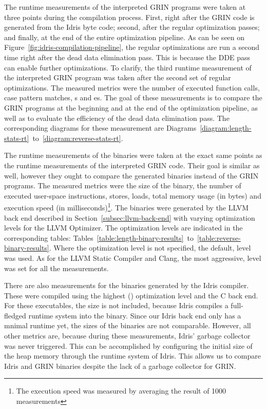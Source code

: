 \documentclass[main.tex]{subfiles}
\begin{document}
	The runtime measurements of the interpreted GRIN programs were taken at three points during the compilation process. First, right after the GRIN code is generated from the Idris byte code; second, after the regular optimization passes; and finally, at the end of the entire optimization pipeline. As can be seen on Figure~\ref{fig:idris-compilation-pipeline}, the regular optimizations are run a second time right after the dead data elimination pass. This is because the DDE pass can enable further optimizations. To clarify, the third runtime measurement of the interpreted GRIN program was taken after the second set of regular optimizations. The measured metrics were the number of executed function calls, case pattern matches, s and es. The goal of these measurements is to compare the GRIN programs at the beginning and at the end of the optimization pipeline, as well as to evaluate the efficiency of the dead data elimination pass. The corresponding diagrams for these measurement are Diagrams~\ref{diagram:length-stats-rt}~to~\ref{diagram:reverse-stats-rt}.


	The runtime measurements of the binaries were taken at the exact same points as the runtime measurements of the interpreted GRIN code. Their goal is similar as well, however they ought to compare the generated binaries instead of the GRIN programs. The measured metrics were the size of the binary, the number of executed user-space instructions, stores, loads, total memory usage (in bytes) and execution speed (in milliseconds)\footnote{The execution speed was measured by averaging the result of 1000 measurements}. The binaries were generated by the LLVM back end described in Section~\ref{subsec:llvm-back-end} with varying optimization levels for the LLVM Optimizer. The optimization levels are indicated in the corresponding tables: Tables~\ref{table:length-binary-results}~to~\ref{table:reverse-binary-results}. Where the optimization level is not specified, the default,  level was used. As for the LLVM Static Compiler and Clang, the most aggressive,  level was set for all the measurements.
	
	There are also measurements for the binaries generated by the Idris compiler. These were compiled using the highest () optimization level and the C back end. For these executables, the size is not included, because Idris compiles a full-fledged runtime system into the binary. Since our Idris back end only has a mnimal runtime yet, the sizes of the binaries are not comparable. However, all other metrics are, because during these measurements, Idris' garbage collector was never triggered. This can be accomplished by configuring the initial size of the heap memory through the runtime system of Idris. This allows us to compare Idris and GRIN binaries despite the lack of a garbage collector for GRIN.
	
\end{document}
